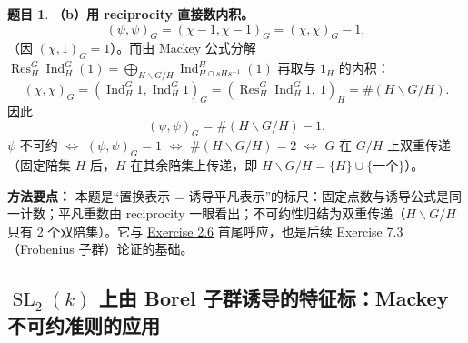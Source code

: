 \documentclass[a4paper]{ctexart}
\theoremstyle{definition}
\newtheorem{example}{题目}[section]
\theoremstyle{analysis}
\theoremstyle{plain}
\begin{document}
\begin{example}
\textbf{（b）用 reciprocity 直接数内积。}
\[
  (\psi,\psi)_G=(\chi-1,\chi-1)_G=(\chi,\chi)_G-1,
\]
（因 \((\chi,1)_G=1\)）。而由 Mackey 公式分解 \(\operatorname{Res}_H^G\operatorname{Ind}_H^G(1)=\bigoplus_{H\backslash G/H}\operatorname{Ind}_{H\cap sHs^{-1}}^H(1)\) 再取与 \(1_H\) 的内积：
\[
  (\chi,\chi)_G=(\operatorname{Ind}_H^G 1,\operatorname{Ind}_H^G 1)_G
  =(\operatorname{Res}_H^G\operatorname{Ind}_H^G 1,\ 1)_H
  =\#(H\backslash G/H).
\]
因此
\[
  (\psi,\psi)_G=\#(H\backslash G/H)-1.
\]
\(\psi\) 不可约 \(\iff\) \((\psi,\psi)_G=1\) \(\iff\) \(\#(H\backslash G/H)=2\) \(\iff\) \(G\) 在 \(G/H\) 上双重传递（固定陪集 \(H\) 后，\(H\) 在其余陪集上传递，即 \(H\backslash G/H=\{H\}\cup\{\text{一个}\}\)）。

\textbf{方法要点：}
本题是“置换表示 = 诱导平凡表示”的标尺：固定点数与诱导公式是同一计数；平凡重数由 reciprocity 一眼看出；不可约性归结为双重传递（\(H\backslash G/H\) 只有 2 个双陪集）。它与 \hyperref[subsec:problem-serre-permutation-double-transitive]{Exercise 2.6} 首尾呼应，也是后续 Exercise 7.3（Frobenius 子群）论证的基础。
\end{example}

\subsection{\texorpdfstring{\(\operatorname{SL}_2(k)\) 上由 Borel 子群诱导的特征标：Mackey 不可约准则的应用}{SL2(k) 上由 Borel 子群诱导的特征标：Mackey 不可约准则的应用}}\label{subsec:problem-serre-sl2-induced-mackey}
\end{document}
